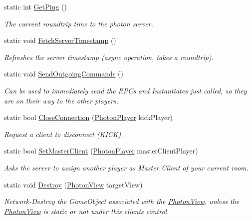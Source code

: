 \begin{DoxyCompactItemize}
static int \hyperlink{class_photon_network_a901a33962274b4467919acd868016d6b}{Get\+Ping} ()
\begin{DoxyCompactList}\small\item\em The current roundtrip time to the photon server. \end{DoxyCompactList}\item 
static void \hyperlink{class_photon_network_a88ef2952a1d0a468d5ba2bff48fa084c}{Fetch\+Server\+Timestamp} ()
\begin{DoxyCompactList}\small\item\em Refreshes the server timestamp (async operation, takes a roundtrip). \end{DoxyCompactList}\item 
static void \hyperlink{class_photon_network_a3b8d0c1cefdf577e1dff8aecb147b7fd}{Send\+Outgoing\+Commands} ()
\begin{DoxyCompactList}\small\item\em Can be used to immediately send the R\+P\+Cs and Instantiates just called, so they are on their way to the other players. \end{DoxyCompactList}\item 
static bool \hyperlink{class_photon_network_a9cc8da229d513fce2fddbc5e2c6eaed2}{Close\+Connection} (\hyperlink{class_photon_player}{Photon\+Player} kick\+Player)
\begin{DoxyCompactList}\small\item\em Request a client to disconnect (K\+I\+CK). \end{DoxyCompactList}\item 
static bool \hyperlink{class_photon_network_a85b058bab4a369d0c5730cf43b462962}{Set\+Master\+Client} (\hyperlink{class_photon_player}{Photon\+Player} master\+Client\+Player)
\begin{DoxyCompactList}\small\item\em Asks the server to assign another player as Master Client of your current room. \end{DoxyCompactList}\item 
static void \hyperlink{class_photon_network_a52fdada993f0729be0912113c0ddb3f8}{Destroy} (\hyperlink{class_photon_view}{Photon\+View} target\+View)
\begin{DoxyCompactList}\small\item\em Network-\/\+Destroy the Game\+Object associated with the \hyperlink{class_photon_view}{Photon\+View}, unless the \hyperlink{class_photon_view}{Photon\+View} is static or not under this client\textquotesingle{}s control. \end{DoxyCompactList}\item 

\end{DoxyCompactItemize}
